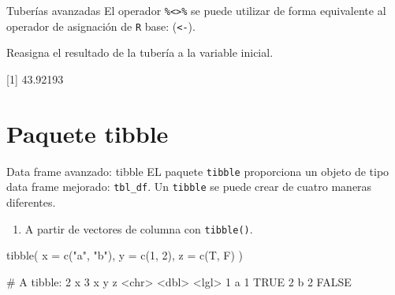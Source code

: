 \documentclass[
  ignorenonframetext,
  aspectratio=169]{beamer}
\newenvironment{Shaded}{\begin{snugshade}}{\end{snugshade}}
\newcommand{\AttributeTok}[1]{\textcolor[rgb]{0.77,0.63,0.00}{#1}}
\newcommand{\DecValTok}[1]{\textcolor[rgb]{0.00,0.00,0.81}{#1}}
\newcommand{\FunctionTok}[1]{\textcolor[rgb]{0.00,0.00,0.00}{#1}}
\newcommand{\NormalTok}[1]{#1}
\newcommand{\OtherTok}[1]{\textcolor[rgb]{0.56,0.35,0.01}{#1}}
\newcommand{\SpecialCharTok}[1]{\textcolor[rgb]{0.00,0.00,0.00}{#1}}
\newcommand{\StringTok}[1]{\textcolor[rgb]{0.31,0.60,0.02}{#1}}
\providecommand{\tightlist}{%
  \setlength{\itemsep}{0pt}\setlength{\parskip}{0pt}}
\let\oldverbatim\verbatim
\let\endoldverbatim\endverbatim
\renewenvironment{verbatim}{\tiny\oldverbatim}{\endoldverbatim}
\begin{document}
\begin{frame}[fragile]{Tuberías avanzadas}
\protect\hypertarget{tuberuxedas-avanzadas-1}{}
El operador \texttt{\%\textless{}\textgreater{}\%} se puede utilizar de
forma equivalente al operador de asignación de \texttt{R} base:
(\texttt{\textless{}-}).

Reasigna el resultado de la tubería a la variable inicial.

\hfill\break

\begin{Shaded}
\end{Shaded}

{[}1{]} 43.92193
\end{frame}

\hypertarget{paquete-tibble}{%
\section{Paquete tibble}\label{paquete-tibble}}

\begin{frame}[fragile]{Data frame avanzado: tibble}
\protect\hypertarget{data-frame-avanzado-tibble}{}
EL paquete \texttt{tibble} proporciona un objeto de tipo data frame
mejorado: \texttt{tbl\_df}. Un \texttt{tibble} se puede crear de cuatro
maneras diferentes.

\begin{enumerate}
\tightlist
\item
  A partir de vectores de columna con \texttt{tibble()}.
\end{enumerate}

\begin{Shaded}
\begin{Highlighting}[]
\FunctionTok{tibble}\NormalTok{(}
  \AttributeTok{x =} \FunctionTok{c}\NormalTok{(}\StringTok{"a"}\NormalTok{, }\StringTok{"b"}\NormalTok{),}
  \AttributeTok{y =} \FunctionTok{c}\NormalTok{(}\DecValTok{1}\NormalTok{, }\DecValTok{2}\NormalTok{),}
  \AttributeTok{z =} \FunctionTok{c}\NormalTok{(T, F)}
\NormalTok{)}
\end{Highlighting}
\end{Shaded}

\begin{verbatim}
# A tibble: 2 x 3
  x         y z    
  <chr> <dbl> <lgl>
1 a         1 TRUE 
2 b         2 FALSE
\end{verbatim}
\end{frame}
\end{document}
